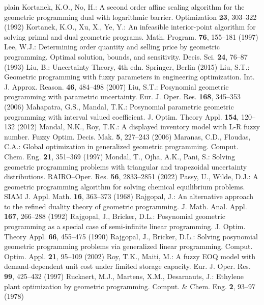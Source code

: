 \begin{thebibliography}{plain}
 Kortanek, K.O., No, H.: A second order affine scaling algorithm for the geometric programming dual with logarithmic barrier. Optimization {\bf23}, 303--322
(1992)
 Kortanek, K.O., Xu, X., Ye, Y.: An infeasible interior-point algorithm for solving primal and dual geometric programs. Math. Program. {\bf 76}, 155--181 (1997) 
 Lee, W.J.: Determining order quantity and selling price by geometric programming. Optimal solution, bounds, and sensitivity. Decis. Sci. {\bf 24}, 76--87 (1993)
 Liu, B.: Uncertainty Theory, 4th edn. Springer, Berlin (2015)
 Liu, S.T.: Geometric programming with fuzzy parameters in engineering optimization. Int. J. Approx. Reason. {\bf 46}, 484--498 (2007)
 Liu, S.T.: Posynomial geometric programming with parametric uncertainty. Eur. J. Oper. Res. {\bf 168}, 345--353 (2006)
 Mahapatra, G.S., Mandal, T.K.: Posynomial parametric geometric programming with interval valued coefficient. J. Optim. Theory Appl. {\bf 154}, 120--132 (2012)
 Mandal, N.K., Roy, T.K.: A displayed inventory model with L-R fuzzy number. Fuzzy Optim. Decis. Mak. {\bf 5}, 227--243 (2006)
 Maranas, C.D., Floudas, C.A.: Global optimization in generalized geometric programming. Comput. Chem. Eng. {\bf 21}, 351--369 (1997)
 Mondal, T., Ojha, A.K., Pani, S.: Solving geometric programming problems with triangular and trapezoidal uncertainty distributions. RAIRO--Oper. Res. {\bf 56}, 2833--2851 (2022)
 Passy, U., Wilde, D.J.: A geometric programming algorithm for solving chemical equilibrium problems. SIAM J. Appl. Math. {\bf 16}, 363--373 (1968)
 Rajgopal, J.: An alternative approach to the refined duality theory of geometric programming. J. Math. Anal. Appl. {\bf 167}, 266--288 (1992)
 Rajgopal, J., Bricker, D.L.: Posynomial geometric programming as a special case of semi-infinite linear programming. J. Optim. Theory Appl. {\bf 66}, 455--475 (1990)
 Rajgopal, J., Bricker, D.L.: Solving posynomial geometric programming problems via generalized linear programming. Comput. Optim. Appl. {\bf 21}, 95--109 (2002)
 Roy, T.K., Maiti, M.: A fuzzy EOQ model with demand-dependent unit cost under limited storage capacity. Eur. J. Oper. Res. {\bf 99}, 425--432 (1997)
 Ruckaert, M.J., Martens, X.M., Desarnauts, J.: Ethylene plant optimization by geometric programming. Comput. \& Chem. Eng. {\bf 2}, 93--97 (1978)

\end{thebibliography}
